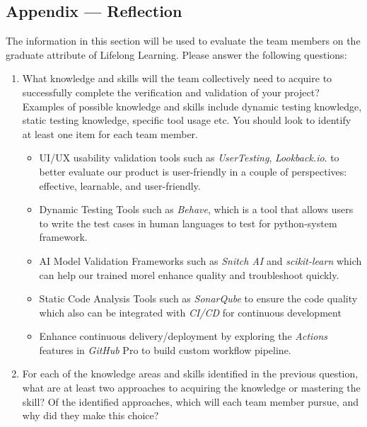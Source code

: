 \documentclass[12pt, titlepage]{article}
\begin{document}
\begin{enumerate}
\newpage{}
\section*{Appendix --- Reflection}


The information in this section will be used to evaluate the team members on the
graduate attribute of Lifelong Learning.  Please answer the following questions:

\begin{enumerate}
  \item What knowledge and skills will the team collectively need to acquire to
  successfully complete the verification and validation of your project?
  Examples of possible knowledge and skills include dynamic testing knowledge,
  static testing knowledge, specific tool usage etc.  You should look to
  identify at least one item for each team member.


  \begin{itemize}
    \item UI/UX usability validation tools such  as \textit{UserTesting}, \textit{Lookback.io}. to better evaluate our product is user-friendly in a couple of perspectives: effective, learnable, and user-friendly.
    \item Dynamic Testing Tools such as \textit{Behave}, which is a tool that allows users to write the test cases in human languages to test for python-system framework. 
    \item AI Model Validation Frameworks such as \textit{Snitch AI} and \textit{scikit-learn} which can help our trained morel enhance quality and troubleshoot quickly.
    \item Static Code Analysis Tools such as \textit{SonarQube} to ensure the code quality which also can be integrated with \textit{CI/CD} for continuous development
    \item Enhance continuous delivery/deployment by exploring the \textit{Actions} features in \textit{GitHub} Pro to build custom workflow pipeline.
   \end{itemize} 


  \item For each of the knowledge areas and skills identified in the previous
  question, what are at least two approaches to acquiring the knowledge or
  mastering the skill?  Of the identified approaches, which will each team
  member pursue, and why did they make this choice?


\end{enumerate}
\end{enumerate}
\end{document}
